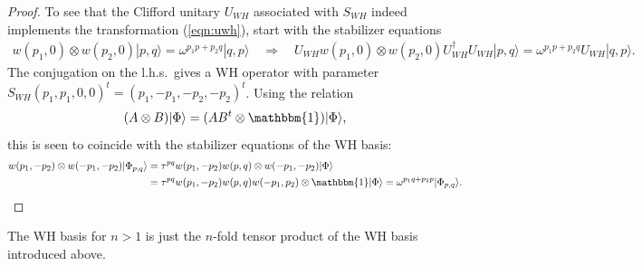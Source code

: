 \documentclass[aps,nofootinbib,floatfix,a4paper]{revtex4}
\newcommand{\1}{\mbox{$\mathbf{1}$}}
\def\Id{\mathbbm{1}}
\begin{document}
\begin{proof}
	To see that the Clifford unitary $U_{WH}$ associated with 
	$S_{WH}$
	indeed implements the transformation (\ref{eqn:uwh}), start with the stabilizer equations
	\begin{align*}
		w(p_1,0)\otimes w(p_2,0) |p,q\rangle
		=
		\omega^{p_1 p + p_2 q} |q,p\rangle 
		\quad\Rightarrow\quad
		U_{WH}w(p_1,0)\otimes w(p_2,0)U_{WH}^\dagger U_{WH}|p,q\rangle
		=
		\omega^{p_1 p + p_2 q} 
		U_{WH}
		|q,p\rangle .
	\end{align*}
	The conjugation on the l.h.s.\ gives a WH operator with parameter $S_{WH}(p_1,p_1,0,0)^t=(p_1,-p_1,-p_2,-p_2)^t$.
	Using the relation
	\begin{align*}
		(A\otimes B)|\Phi\rangle = (A B^t \otimes \Id) |\Phi\rangle,
	\end{align*}
	this is seen to coincide with the stabilizer equations of the WH basis:
	\begin{align}
		\begin{split}
		\label{eqn:wh_stabilizer}
		w(p_1,-p_2) \otimes w(-p_1, -p_2) |\Phi_{p,q}\rangle
		&=
		\tau^{pq} 
		w(p_1,-p_2) w(p,q) \otimes w(-p_1, -p_2) |\Phi\rangle \\
		&=
		\tau^{pq} 
		w(p_1,-p_2) w(p,q) w(-p_1,p_2)\otimes \Id |\Phi\rangle 
		=
		\omega^{p_1 q + p_2 p}
		|\Phi_{{p,q}}\rangle.
		\end{split}
	\end{align}
\end{proof}


The WH basis for $n>1$ is just the $n$-fold tensor product of the WH basis introduced above.
\end{document}
